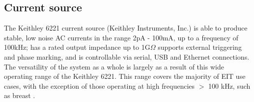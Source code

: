 \subsection{Current source}

The Keithley 6221 current source (Keithley Instruments, Inc.) is able to produce stable, low noise AC currents in the range 2pA - 100mA, up to a frequency of 100kHz; has a rated output impedance up to 1G\(\Omega\) supports external triggering and phase marking, and is controllable via serial, USB and Ethernet connections. The versatility of the system as a whole is largely as a result of this wide operating range of the Keithley 6221. This range covers the majority of EIT use cases, with the exception of those operating at high frequencies $>$ 100 kHz, such as breast \cite{khan}. 